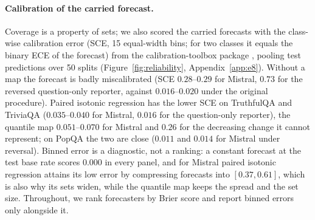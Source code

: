 \documentclass[11pt]{article}
\theoremstyle{definition}
\theoremstyle{remark}
\newcommand{\1}{\mathbf{1}}
\begin{document}
\paragraph{Calibration of the carried forecast.} Coverage
is a property of sets; we also scored the carried forecasts with the class-wise calibration error
(SCE, 15 equal-width bins; for two classes it equals the binary ECE of the forecast) from the
calibration-toolbox package \citep{pearce2026calibrationtoolbox}, pooling test predictions over 50
splits (Figure~\ref{fig:reliability}, Appendix~\ref{app:e8}). Without a map the forecast is badly
miscalibrated (SCE $0.28$--$0.29$ for Mistral, $0.73$ for the reversed question-only reporter, against
$0.016$--$0.020$ under the original procedure). Paired isotonic regression has the lower SCE on TruthfulQA
and TriviaQA ($0.035$--$0.040$ for Mistral, $0.016$ for the question-only reporter), the quantile map
$0.051$--$0.070$ for Mistral and $0.26$ for the decreasing change it cannot represent; on PopQA the two are
close ($0.011$ and $0.014$ for Mistral under reversal). Binned error is a diagnostic, not a ranking: a
constant forecast at the test base rate scores $0.000$ in every panel, and for Mistral paired isotonic
regression attains its low error by compressing forecasts into $[0.37,0.61]$, which is also why its sets
widen, while the quantile map keeps the spread and the set size. Throughout, we rank forecasters by Brier
score and report binned errors only alongside it.
\end{document}
